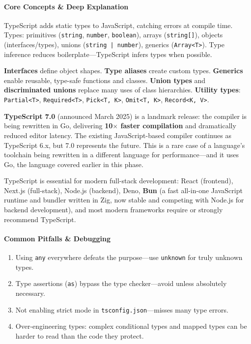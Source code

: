 \documentclass[11pt, a4paper, oneside]{report}
\begin{document}
\paragraph{Core Concepts \& Deep Explanation} TypeScript adds static types to JavaScript, catching errors at compile time. Types: primitives (\texttt{string}, \texttt{number}, \texttt{boolean}), arrays (\texttt{string[]}), objects (interfaces/types), unions (\texttt{string | number}), generics (\texttt{Array<T>}). Type inference reduces boilerplate---TypeScript infers types when possible.

\textbf{Interfaces} define object shapes. \textbf{Type aliases} create custom types. \textbf{Generics} enable reusable, type-safe functions and classes. \textbf{Union types} and \textbf{discriminated unions} replace many uses of class hierarchies. \textbf{Utility types}: \texttt{Partial<T>}, \texttt{Required<T>}, \texttt{Pick<T, K>}, \texttt{Omit<T, K>}, \texttt{Record<K, V>}.

\textbf{TypeScript 7.0} (announced March 2025) is a landmark release: the compiler is being rewritten in Go, delivering \textbf{10$\times$ faster compilation} and dramatically reduced editor latency. The existing JavaScript-based compiler continues as TypeScript 6.x, but 7.0 represents the future. This is a rare case of a language's toolchain being rewritten in a different language for performance---and it uses Go, the language covered earlier in this phase.

TypeScript is essential for modern full-stack development: React (frontend), Next.js (full-stack), Node.js (backend), Deno, \textbf{Bun} (a fast all-in-one JavaScript runtime and bundler written in Zig, now stable and competing with Node.js for backend development), and most modern frameworks require or strongly recommend TypeScript.

\paragraph{Common Pitfalls \& Debugging}
\begin{enumerate}[leftmargin=*]
\item Using \texttt{any} everywhere defeats the purpose---use \texttt{unknown} for truly unknown types.
\item Type assertions (\texttt{as}) bypass the type checker---avoid unless absolutely necessary.
\item Not enabling strict mode in \texttt{tsconfig.json}---misses many type errors.
\item Over-engineering types: complex conditional types and mapped types can be harder to read than the code they protect.
\end{enumerate}
\end{document}

